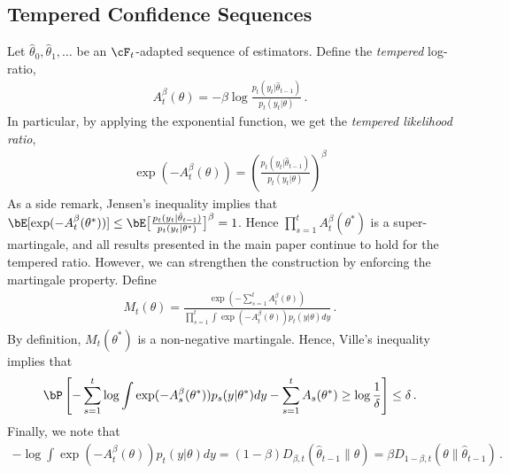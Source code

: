 \subsection{Tempered Confidence Sequences}
Let $\hat \theta_0, \hat \theta_1, \dots$ be an $\cF_t$-adapted sequence of estimators.
Define the \emph{tempered} log-ratio, 
\begin{align}
    A_t^\beta(\theta) = - \beta \log \frac{p_t(y_t|\hat \theta_{t-1})}{p_t(y_t|\theta)} \,.
\end{align}
In particular, by applying the exponential function, we get the \emph{tempered likelihood ratio},
\begin{align*}
\exp(-A_t^\beta(\theta)) = \left(\frac{p_t(y_t|\hat \theta_{t-1})}{p_t(y_t|\theta)}\right)^\beta
\end{align*}
As a side remark, Jensen's inequality implies that 
$\bE[\exp(-A_t^\beta(\theta^*))] \leq  \bE\big[\frac{p_t(y_t|\hat \theta_{t-1})}{p_t(y_t|\theta^*)}\big]^\beta = 1$.
Hence $\prod_{s=1}^t A_t^\beta(\theta^*)$ is a super-martingale, and all results presented in the main paper continue to hold for the tempered ratio. However, we can strengthen the construction by enforcing the martingale property. Define
\begin{align*}
M_t(\theta) = \frac{\exp(- \sum_{s=1}^t A_t^\beta(\theta))}{\textstyle \prod_{s=1}^t \int \exp(- A_t^\beta(\theta)) p_t(y|\theta) dy} \,.
\end{align*}
By definition, $M_t(\theta^*)$ is a non-negative martingale. 
Hence, Ville's inequality implies that
\begin{align*}
   \bP\left[- \sum_{s=1}^t \log \int \exp(- A_s^\beta(\theta^*)) p_s(y|\theta^*) dy - \sum_{s=1}^t A_s(\theta^*) \geq \log \frac{1}{\delta}\right] \leq \delta \,.
\end{align*}
Finally, we note that 
\begin{align*}
   - \log \int \exp(- A_t^\beta(\theta)) p_t(y|\theta) dy = (1 - \beta) D_{\beta,t}(\hat \theta_{t-1} \| \theta)= \beta D_{1-\beta,t}(\theta\|\hat \theta_{t-1}) \,.
\end{align*}

